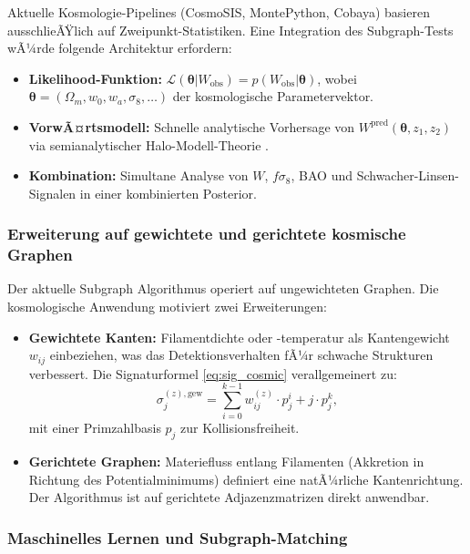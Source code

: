 ﻿\documentclass[a4paper,12pt]{article}
\theoremstyle{definition}
\theoremstyle{remark}
\begin{document}
Aktuelle Kosmologie-Pipelines (CosmoSIS, MontePython, Cobaya) basieren
ausschlieÃŸlich auf Zweipunkt-Statistiken. Eine Integration des Subgraph-Tests
wÃ¼rde folgende Architektur erfordern:

\begin{itemize}
  \item \textbf{Likelihood-Funktion:} $\mathcal{L}(\boldsymbol\theta | W_\mathrm{obs})
    = p(W_\mathrm{obs} | \boldsymbol\theta)$, wobei $\boldsymbol\theta =
    (\Omega_m, w_0, w_a, \sigma_8, \ldots)$ der kosmologische Parametervektor.
  \item \textbf{VorwÃ¤rtsmodell:} Schnelle analytische Vorhersage von
    $W^\mathrm{pred}(\boldsymbol\theta, z_1, z_2)$ via semianalytischer
    Halo-Modell-Theorie \cite{peebles1993}.
  \item \textbf{Kombination:} Simultane Analyse von $W$, $f\sigma_8$, BAO
    und Schwacher-Linsen-Signalen in einer kombinierten Posterior.
\end{itemize}

\subsubsection*{Erweiterung auf gewichtete und gerichtete kosmische Graphen}

Der aktuelle Subgraph Algorithmus \cite{eppsubgraph2026} operiert auf
ungewichteten Graphen. Die kosmologische Anwendung motiviert zwei Erweiterungen:

\begin{itemize}
  \item \textbf{Gewichtete Kanten:} Filamentdichte oder -temperatur als
    Kantengewicht $w_{ij}$ einbeziehen, was das Detektionsverhalten fÃ¼r
    schwache Strukturen verbessert. Die Signaturformel
    \eqref{eq:sig_cosmic} verallgemeinert zu:
    \[
      \sigma_j^{(z),\text{gew}} = \sum_{i=0}^{k-1} w_{ij}^{(z)} \cdot p_j^i
      + j \cdot p_j^k,
    \]
    mit einer Primzahlbasis $p_j$ zur Kollisionsfreiheit.
  \item \textbf{Gerichtete Graphen:} Materiefluss entlang Filamenten
    (Akkretion in Richtung des Potentialminimums) definiert eine natÃ¼rliche
    Kantenrichtung. Der Algorithmus ist auf gerichtete Adjazenzmatrizen
    direkt anwendbar.
\end{itemize}

\subsubsection*{Maschinelles Lernen und Subgraph-Matching}
\end{document}
